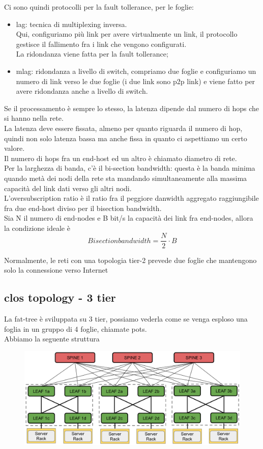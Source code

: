 \documentclass[12pt, oneside]{extbook} %
\begin{document}
Ci sono quindi protocolli per la fault tollerance, per le foglie:
\begin{itemize}
    \item lag: tecnica di multiplexing inversa.
    \\Qui, configuriamo più link per avere virtualmente un link, il protocollo gestisce il fallimento fra i link che vengono configurati.
    \\La ridondanza viene fatta per la fault tollerance;
    \item mlag: ridondanza a livello di switch, compriamo due foglie e configuriamo un numero di link verso le due foglie (i due link sono p2p link) e viene fatto per avere ridondanza anche a livello di switch.
\end{itemize}
Se il processamento è sempre lo stesso, la latenza dipende dal numero di hops che si hanno nella rete.
\\La latenza deve essere fissata, almeno per quanto riguarda il numero di hop, quindi non solo latenza bassa ma anche fissa in quanto ci aspettiamo un certo valore.
\\Il numero di hops fra un end-host ed un altro è chiamato diametro di rete.
\\Per la larghezza di banda, c'è il bi-section bandwidth: questa è la banda minima quando metà dei nodi della rete sta mandando simultaneamente alla massima capacità del link dati verso gli altri nodi.
\\L'oversubscription ratio è il ratio fra il peggiore danwidth aggregato raggiungibile fra due end-host diviso per il bisection bandwidth.
\\Sia N il numero di end-nodes e B bit/s la capacità dei link fra end-nodes, allora la condizione ideale è
\begin{equation}
    Bisection bandwidth = \frac{N}{2} \cdot B
\end{equation}

Normalmente, le reti con una topologia tier-2 prevede due foglie che mantengono solo la connessione verso Internet

\subsection{clos topology - 3 tier}
La fat-tree è sviluppata su 3 tier, possiamo vederla come se venga esploso una foglia in un gruppo di 4 foglie, chiamate pots.
\\Abbiamo la seguente struttura\\
\begin{figure}[h!]
    \centering
    \includegraphics[scale=0.5]{../../immagini/fat_tree}
\end{figure}
\end{document}
